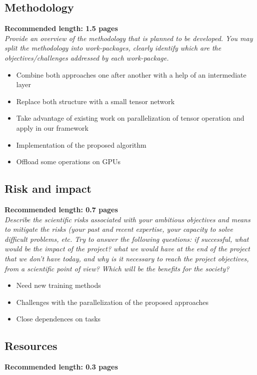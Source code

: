 \subsection*{Methodology} 
\textbf{Recommended length: 1.5 pages}\\

\textit{Provide an overview of the methodology that is planned to be developed. You may split the methodology into work-packages, clearly identify which are the objectives/challenges addressed by each work-package.}

\begin{itemize}
	\item Combine both approaches one after another with a help of an intermediate layer
	\item Replace both structure with a small tensor network
	\item Take advantage of existing work on parallelization of tensor operation and apply in our framework
	\item Implementation of the proposed algorithm
	\item Offload some operations on GPUs
\end{itemize}

\subsection*{Risk and impact}
\textbf{Recommended length: 0.7 pages}\\

\textit{Describe the scientific risks associated with your ambitious objectives and means to mitigate the risks (your past and recent expertise, your capacity to solve difficult problems, etc. Try to answer the following questions: if successful, what would be the impact of the project? what we would have at the end of the project that we don't have today, and why is it necessary to reach the project objectives, from a scientific point of view? Which will be the benefits for the society?}

	\begin{itemize}
	\item Need new training methods
	\item Challenges with the parallelization of the proposed approaches
	\item Close dependences on tasks
\end{itemize}

\subsection*{Resources}
\textbf{Recommended length: 0.3 pages}\\

